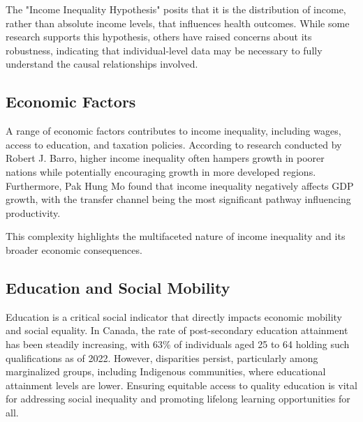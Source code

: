 \documentclass[12pt]{article}
\begin{document}
The "Income Inequality Hypothesis" posits that it is the distribution of income, rather than absolute income levels, that influences health outcomes. While some research supports this hypothesis, others have raised concerns about its robustness, indicating that individual-level data may be necessary to fully understand the causal relationships involved.

\subsection*{Economic Factors}

A range of economic factors contributes to income inequality, including wages, access to education, and taxation policies.  According to research conducted by Robert J. Barro, higher income inequality often hampers growth in poorer nations while potentially encouraging growth in more developed regions. Furthermore, Pak Hung Mo found that income inequality negatively affects GDP growth, with the transfer channel being the most significant pathway influencing productivity.

This complexity highlights the multifaceted nature of income inequality and its broader economic consequences.

\subsection*{Education and Social Mobility}

Education is a critical social indicator that directly impacts economic mobility and social equality. In Canada, the rate of post-secondary education attainment has been steadily increasing, with 63\% of individuals aged 25 to 64 holding such qualifications as of 2022. However, disparities persist, particularly among marginalized groups, including Indigenous communities, where educational attainment levels are lower. Ensuring equitable access to quality education is vital for addressing social inequality and promoting lifelong learning opportunities for all.
\end{document}
